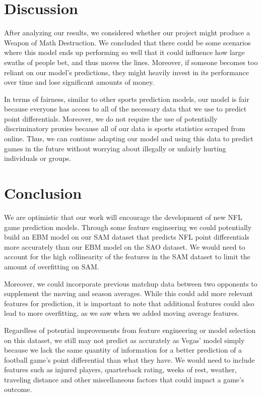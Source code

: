 \documentclass{article}
\begin{document}
\begin{multicols}{2}
\section{Discussion}
After analyzing our results, we considered whether our project might produce a Weapon of Math Destruction. We concluded that there could be some scenarios where this model ends up performing so well that it could influence how large swaths of people bet, and thus moves the lines. Moreover, if someone becomes too reliant on our model’s predictions, they might heavily invest in its performance over time and lose significant amounts of money. 

In terms of fairness, similar to other sports prediction models, our model is fair because everyone has access to all of the necessary data that we use to predict point differentials. Moreover, we do not require the use of potentially discriminatory proxies because all of our data is sports statistics scraped from online. Thus, we can continue adapting our model and using this data to predict games in the future without worrying about illegally or unfairly hurting individuals or groups. 
\section{Conclusion}
We are optimistic that our work will encourage the development of new NFL game prediction models. Through some feature engineering we could potentially build an EBM model on our SAM dataset that predicts NFL point differentials more accurately than our EBM model on the SAO dataset. We would need to account for the high collinearity of the features in the SAM dataset to limit the amount of overfitting on SAM. 

Moreover, we could incorporate previous matchup data between two opponents to supplement the moving and season averages. While this could add more relevant features for prediction, it is important to note that additional features could also lead to more overfitting, as we saw when we added moving average features. 

Regardless of potential improvements from feature engineering or model selection on this dataset, we still may not predict as accurately as Vegas’ model simply because we lack the same quantity of information for a better prediction of a football game’s point differential than what they have. We would need to include features such as injured players, quarterback rating, weeks of rest, weather, traveling distance and other miscellaneous factors that could impact a game's outcome.


\end{multicols}
\end{document}
